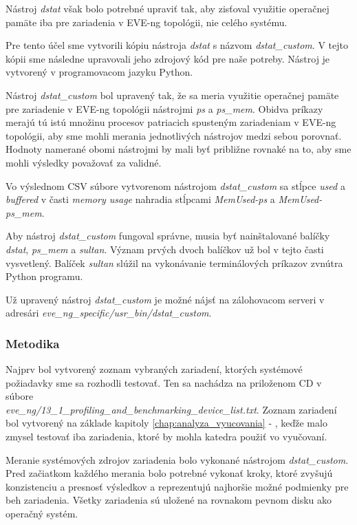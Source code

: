 Nástroj \emph{dstat} však bolo potrebné upraviť tak, aby zisťoval využitie operačnej pamäte iba pre zariadenia v EVE-ng topológii, nie celého systému.

Pre tento účel sme vytvorili kópiu nástroja \emph{dstat} s názvom \emph{dstat\_custom}. V tejto kópii sme následne upravovali jeho zdrojový kód pre naše potreby. Nástroj je vytvorený v programovacom jazyku Python.

Nástroj \emph{dstat\_custom} bol upravený tak, že sa meria využitie operačnej pamäte pre zariadenie v EVE-ng topológii nástrojmi \emph{ps} a \emph{ps\_mem}. Obidva príkazy merajú tú istú množinu procesov patriacich spusteným zariadeniam v EVE-ng topológii, aby sme mohli merania jednotlivých nástrojov medzi sebou porovnať. Hodnoty namerané obomi nástrojmi by mali byť približne rovnaké na to, aby sme mohli výsledky považovať za validné.

Vo výslednom CSV súbore vytvorenom nástrojom \emph{dstat\_custom} sa stĺpce \emph{used} a \emph{buffered} v časti \emph{memory usage} nahradia stĺpcami \emph{MemUsed-ps} a \emph{MemUsed-ps\_mem}.

Aby nástroj \emph{dstat\_custom} fungoval správne, musia byť nainštalované balíčky \emph{dstat}, \emph{ps\_mem} a \emph{sultan}. Význam prvých dvoch balíčkov už bol v tejto časti vysvetlený. Balíček \emph{sultan} slúžil na vykonávanie terminálových príkazov zvnútra Python programu.

Už upravený nástroj \emph{dstat\_custom} je možné nájsť na zálohovacom serveri v adresári \emph{eve\_ng\_specific/usr\_bin/dstat\_custom}.





\subsubsection{Metodika}

Najprv bol vytvorený zoznam vybraných zariadení, ktorých systémové požiadavky sme sa rozhodli testovať. Ten sa nachádza na priloženom CD v súbore \\ \emph{eve\_ng/13\_1\_profiling\_and\_benchmarking\_device\_list.txt}. Zoznam zariadení bol vytvorený na základe kapitoly \ref{chap:analyza_vyucovania} - , keďže malo zmysel testovať iba zariadenia, ktoré by mohla katedra použiť vo vyučovaní.

Meranie systémových zdrojov zariadenia bolo vykonané nástrojom \emph{dstat\_custom}. Pred začiatkom každého merania bolo potrebné vykonať kroky, ktoré zvyšujú konzistenciu a presnosť výsledkov a reprezentujú najhoršie možné podmienky pre beh zariadenia. Všetky zariadenia sú uložené na rovnakom pevnom disku ako operačný systém.

